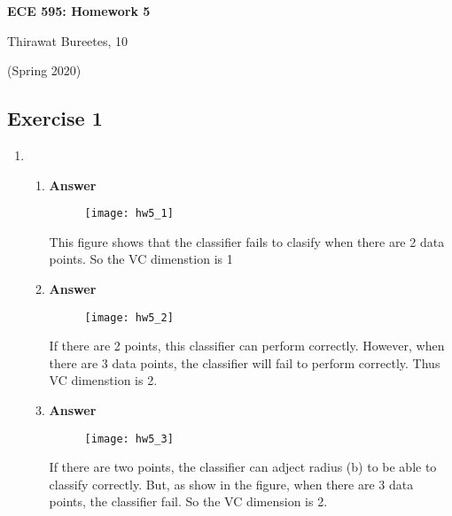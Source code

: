 \documentclass[11pt]{article}
\begin{document}
\begin{center}
\Large{\textbf{ECE 595: Homework 5}}

Thirawat Bureetes, 10

(Spring 2020)
\end{center}

\newpage

\subsection*{Exercise 1}

\begin{enumerate}[label=(\alph*)]


\item 

\begin{enumerate}[label=(\roman*)]

\item 

\noindent\textbf{Answer}

\begin{figure}[H]
\centering
\texttt{[image: hw5\_1]}
\caption{}
\label{}
\end{figure}

This figure shows that the classifier fails to clasify when there are 2 data points. So the VC dimenstion is 1

\item 

\noindent\textbf{Answer}

\begin{figure}[H]
\centering
\texttt{[image: hw5\_2]}
\caption{}
\label{}
\end{figure}

If there are 2 points, this classifier can perform correctly. However, when there are 3 data points, the classifier will fail to perform correctly. Thus VC dimenstion is 2.

\newpage
\item 

\noindent\textbf{Answer}

\begin{figure}[H]
\centering
\texttt{[image: hw5\_3]}
\caption{}
\label{}
\end{figure}

If there are two points, the classifier can adject radius (b) to be able to classify correctly. But, as show in the figure, when there are 3 data points, the classifier fail. So the VC dimension is 2.


\end{enumerate}
\end{enumerate}
\end{document}

